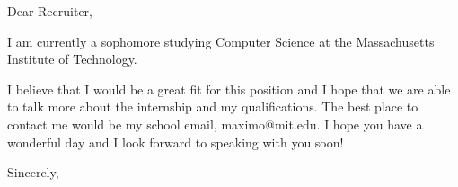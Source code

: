 \documentclass[12pt]{letter}
\begin{document}
\begin{letter}{}
    \opening{Dear Recruiter,}
    I am currently a sophomore studying Computer Science at the Massachusetts Institute of Technology.

    I believe that I would be a great fit for this position and I hope that we are able to talk more about the internship and my qualifications.
    The best place to contact me would be my school email, maximo@mit.edu. I hope you have a wonderful day and I look forward to speaking with you soon!
    \closing{Sincerely,}
\end{letter}
\end{document}
